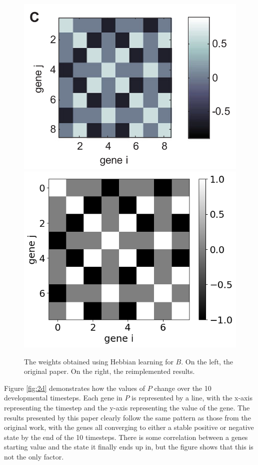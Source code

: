 \documentclass[twocolumn,a4paper,11pt]{article}
\begin{document}
    \begin{figure}[h]
        \centering
        \includegraphics[width=0.48\linewidth]{orig_img/fig2c.png}
        \includegraphics[width=0.48\linewidth]{img/fig2c.png}
        \caption{The weights obtained using Hebbian learning for $B$. On the left, the original paper. On the right, the reimplemented results.} \label{fig:2c}
    \end{figure}

    Figure \ref{fig:2d} demonstrates how the values of $P$ change over the 10 developmental timesteps. Each gene in $P$ is represented by a line, with the x-axis representing the timestep and the y-axis representing the value of the gene. The results presented by this paper clearly follow the same pattern as those from the original work, with the genes all converging to either a stable positive or negative state by the end of the 10 timesteps. There is some correlation between a genes starting value and the state it finally ends up in, but the figure shows that this is not the only factor.
\end{document}
